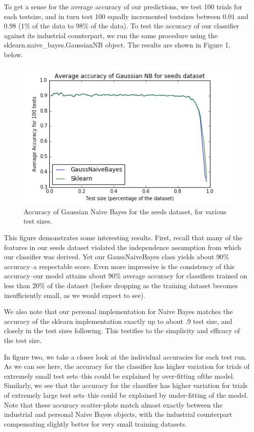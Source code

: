\documentclass[12pt]{article}
\begin{document}
To get a sense for the average accuracy of our predictions, we test 100 trials for each testsize, and in turn test 100 equally incremented testsizes between $0.01$ and $0.98$ ($1\%$ of the data to $98\%$ of the data).
To test the accuracy of our classifier against its industrial counterpart, we run the same procedure using the sklearn.naive\_bayes.GaussianNB object.
The results are shown in Figure 1, below.
\begin{figure}[H] 
    \centering
    \begin{minipage}[b]{0.6\textwidth}
    \includegraphics[width=\textwidth]{AvAccSeeds.png}
    \end{minipage}
    \caption{Accuracy of Gaussian Naive Bayes for the seeds dataset, for various test sizes. }
\end{figure}
This figure demonstrates some interesting results. 
First, recall that many of the features in our seeds dataset violated the independence assumption from which our classifier was derived.
Yet our GaussNaiveBayes class yields about 90$\%$ accuracy--a respectable score.
Even more impressive is the consistency of this accuracy--our model attains about $90\%$ average accuracy for classifiers trained on less than 20\% of the dataset (before dropping as the training dataset becomes insufficiently small, as we would expect to see).

We also note that our personal implementation for Naive Bayes matches the accuracy of the sklearn implementation exactly up to about .9 test size, and closely in the test sizes following.
This testifies to the simplicity and efficacy of the test size.

In figure two, we take a closer look at the individual accuracies for each test run. 
As we can see here, the accuracy for the classifier has higher variation for trials of extremely small test sets--this could be explained by over-fitting ofthe model. 
Similarly, we see that the accuracy for the classifier has higher variation for trials of extremely large test sets--this could be explained by under-fitting of the model. 
Note that these accuracy scatter-plots match almost exactly between the industrial and personal Naive Bayes objects, with the industrial counterpart compensating slightly better for very small training datasets.
\end{document}
